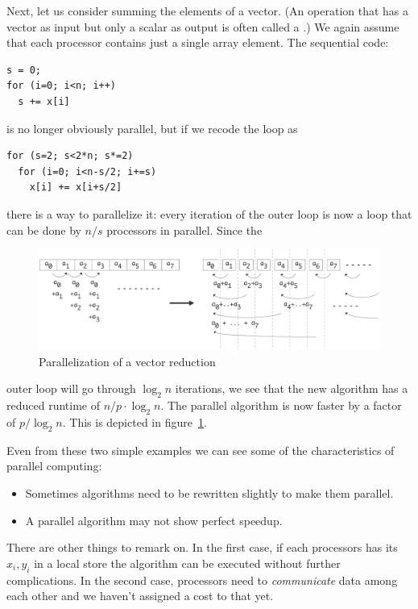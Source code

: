 Next, let us consider summing the elements of a vector.
(An operation that has a vector as input but only a scalar as output
is often called a .)
We again
assume that each processor contains just a single array element. The
sequential code:
\begin{verbatim}
s = 0;
for (i=0; i<n; i++)
  s += x[i]
\end{verbatim}
is no longer obviously parallel, but if we recode the loop as
\begin{verbatim}
for (s=2; s<2*n; s*=2)
  for (i=0; i<n-s/2; i+=s)
    x[i] += x[i+s/2]
\end{verbatim}
there is a way to parallelize it: every iteration of the outer loop is
now a loop that can be done by $n/s$ processors in parallel. Since the
\begin{figure}[ht]
  \includegraphics[scale=.13]{graphics/parallel-sum}
  \caption{Parallelization of a vector reduction}
  \label{fig:par-sum}
\end{figure}
outer loop will go through $\log_2n$ iterations, we see that the new
algorithm has a reduced runtime of $n/p\cdot\log_2 n$. The parallel
algorithm is now faster by a factor of $p/\log_2n$. This is depicted
in figure~\ref{fig:par-sum}.

Even from these two simple examples we can see some of the
characteristics of parallel computing:
\begin{itemize}
\item Sometimes algorithms need to be rewritten slightly to make them
  parallel.
\item A parallel algorithm may not show perfect speedup.
\end{itemize}
There are other things to remark on. In the first case, if each
processors has its $x_i,y_i$ in a local store the
algorithm can be executed without further complications. In the second
case, processors need to \emph{communicate} data among each
other and we haven't assigned a cost to that yet.

